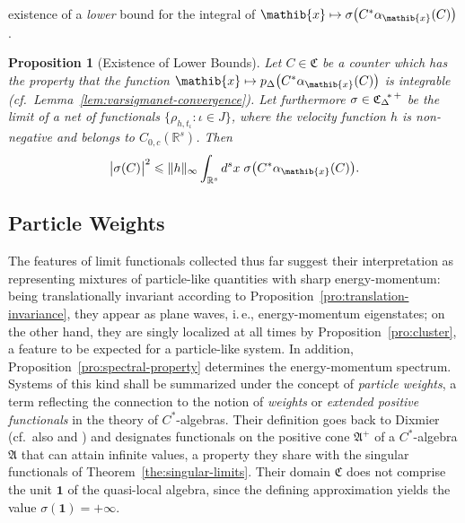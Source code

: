 \documentclass[a4paper,a4paper]{article}
\numberwithin{equation}{section}
\newcommand{\Afrak}{\mathfrak{A}}
\newcommand{\Cfrak}{\mathfrak{C}}
\newcommand{\xib}{\mathib{x}}
\newcommand{\unit}{\mathbf{1}}
\newcommand{\Rs}{\mathbb{R}^s}
\newcommand{\CDstarplus}{{\mathfrak{C}_\Delta}^{\negthickspace *
    \thinspace +}}
\newcommand{\aibx}{\alpha_\mathib{x}}
\theoremstyle{definition}
\theoremstyle{plain}
\newtheorem{proposition}[definition]{Proposition}
\theoremstyle{remark}
\newcommand{\bset}[1]{\bigl\{ #1 \bigr\}}
\newcommand{\babs}[1]{\bigl\lvert #1 \bigr\rvert}
\newcommand{\norm}[1]{\lVert #1 \rVert}
\newcommand{\bpDx}[1]{p_\Delta \bigl( #1 \bigr)}
\begin{document}
  existence of a \emph{lower} bound for the integral of $\xib \mapsto
  \sigma \bigl( C^* \aibx ( C ) \bigr)$.
  \begin{proposition}[Existence of Lower Bounds]
    \label{pro:lower-bounds}
    Let $C \in \Cfrak$ be a counter which has the property that the
    function $\xib \mapsto \bpDx{C^* \aibx ( C )}$ is integrable
    (cf.~Lemma~\ref{lem:varsigmanet-convergence}). Let furthermore
    $\sigma \in \CDstarplus$ be the limit of a net of functionals
    $\bset{\rho_{h , t_\iota} : \iota \in J}$, where the velocity
    function $h$ is non-negative and belongs to $C_{0 , c} ( \Rs )$.
    Then
    \begin{equation}
      \label{eq:lower-bounds}
      \babs{\sigma ( C )}^2 \leqslant \norm{h}_\infty \int_{\Rs} d^s x
      \; \sigma \bigl( C^* \aibx ( C ) \bigr) \text{.}
    \end{equation}
  \end{proposition}

\subsection{Particle Weights}
  \label{subsec:particle-weights}
    
  The features of limit functionals collected thus far suggest their
  interpretation as representing mixtures of particle-like quantities
  with sharp energy-momentum: being translationally invariant
  according to Proposition~\ref{pro:translation-invariance}, they
  appear as plane waves, i.\,e., energy-momentum eigenstates; on the
  other hand, they are singly localized at all times by
  Proposition~\ref{pro:cluster}, a feature to be expected for a
  particle-like system. In addition,
  Proposition~\ref{pro:spectral-property} determines the
  energy-momentum spectrum. Systems of this kind shall be summarized
  under the concept of \emph{particle weights}, a term reflecting the
  connection to the notion of \emph{weights} or \emph{extended
    positive functionals} in the theory of $C^*$-algebras. Their
  definition goes back to Dixmier \cite[Section~I.4.2]{dixmier:1981}
  (cf.~also \cite[Section~5.1]{pedersen:1979} and
  \cite{pedersen:1966}) and designates functionals on the positive
  cone $\Afrak^+$ of a $C^*$-algebra $\Afrak$ that can attain infinite
  values, a property they share with the singular functionals of
  Theorem~\ref{the:singular-limits}. Their domain $\Cfrak$ does not
  comprise the unit $\unit$ of the quasi-local algebra, since the
  defining approximation yields the value $\sigma ( \unit ) = +
  \infty$.
    
\end{document}
